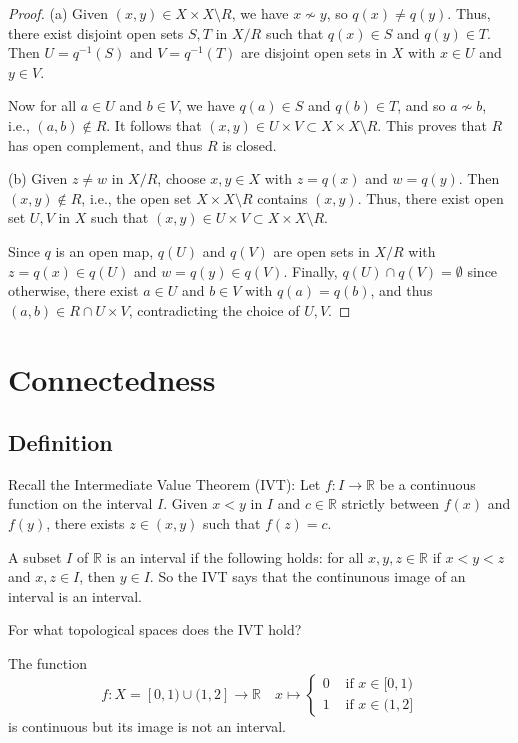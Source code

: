 \documentclass[a4paper]{article}
\begin{document}
\begin{proof}
    (a) Given $(x, y) \in X \times X \setminus R$, we have $x \not\sim y$, so $q(x) \neq q(y)$. Thus, there exist disjoint open sets $S, T$ in $X / R$ such that $q(x) \in S$ and $q(y) \in T$. Then $U=q^{-1}(S)$ and $V=q^{-1}(T)$ are disjoint open sets in $X$ with $x \in U$ and $y \in V$. 
    
    Now for all $a \in U$ and $b \in V$, we have $q(a) \in S$ and $q(b) \in T$, and so $a \not\sim b$, i.e., $(a, b) \notin R$. It follows that $(x, y) \in U \times V \subset X \times X \setminus R$. This proves that $R$ has open complement, and thus $R$ is closed.

(b) Given $z \neq w$ in $X / R$, choose $x, y \in X$ with $z=q(x)$ and $w=q(y)$. Then $(x, y) \notin R$, i.e., the open set $X \times X \setminus R$ contains $(x, y)$. Thus, there exist open set $U, V$ in $X$ such that $(x, y) \in U \times V \subset X \times X \setminus R$. 

Since $q$ is an open map, $q(U)$ and $q(V)$ are open sets in $X / R$ with $z=q(x) \in q(U)$ and $w=q(y) \in q(V)$. Finally, $q(U) \cap q(V)=\emptyset$ since otherwise, there exist $a \in U$ and $b \in V$ with $q(a)=q(b)$, and thus $(a, b) \in R \cap U \times V$, contradicting the choice of $U, V$.
\end{proof}

\section{Connectedness}
\subsection{Definition}

Recall the Intermediate Value Theorem (IVT): Let $f: I \rightarrow \mathbb{R}$ be a continuous function on the interval $I$. Given $x<y$ in $I$ and $c \in \mathbb{R}$ strictly between $f(x)$ and $f(y)$, there exists $z \in(x, y)$ such that $f(z)=c$.

A subset $I$ of $\mathbb{R}$ is an interval if the following holds: for all $x, y, z \in \mathbb{R}$ if $x<y<z$ and $x, z \in I$, then $y \in I$. So the IVT says that the continunous image of an interval is an interval.

\begin{sque}
    For what topological spaces does the IVT hold?
\end{sque}

\begin{example}
    The function
    $$
    f: X=[0,1) \cup(1,2] \rightarrow \mathbb{R} \quad x \mapsto \begin{cases}0 & \text { if } x \in[0,1) \\ 1 & \text { if } x \in(1,2]\end{cases}
    $$
    is continuous but its image is not an interval.
\end{example}
\end{document}
